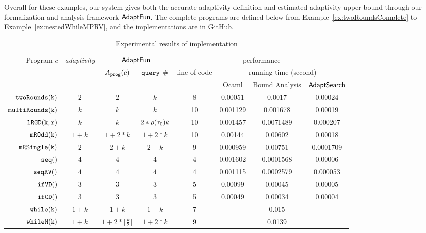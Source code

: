 Overall for these examples, our system gives both the accurate adaptivity definition and estimated
adaptivity upper bound through our formalization and analysis framework $\textsf{AdaptFun}$.
The complete programs are defined below from Example~\ref{ex:twoRoundsComplete} to Example~\ref{ex:nestedWhileMPRV},
and the implementations are in GitHub.
{\tiny
\begin {table}[H]
    \caption{Experimental results of {\THESYSTEM} implementation}
        \label{tb:adapt-imp}
        \begin{center}
        \centering
{\footnotesize
        \begin{tabular}{ r | c | c | c | c | c | c | c  }
        \multirow{3}{*}{Program $c$} & 
        \multirow{3}{*}{\emph{adaptivity}}
         & \multicolumn{2}{c|}{$\textsf{AdaptFun}$}
         & \multicolumn{4}{c}{performance} \\ 
         \cline{3-8}
         & & \multirow{2}{*}{$A_{\mathtt{prog}}(c)$} & \multirow{2}{*}{${\tt query}$ \#} & \multirow{2}{*}{line of code} & \multicolumn{3}{c}{running time (second)} \\ 
         \cline{6-8}
         & & & &  & Ocaml & Bound Analysis & $\mathsf{AdaptSearch}$  \\
         \hline \hline
         $  \mathtt{twoRounds(k)}$ & $2$ &  $2$ & $k$ & 8 & 0.00051 & 0.0017 & 0.00024 \\
         $  \mathtt{multiRounds(k)}$ & $k$ &  $k$ & $k$  &  10 & 0.001129 & 0.001678 & 0.00019 \\
         $  \mathtt{lRGD(k, r)}$ & $k$ & $k$ & $2 * \rho(\mathtt{\tau}_0) k$  &  10 & 0.001457 & 0.0071489 & 0.000207  \\
         $  \mathtt{mROdd(k)}$ & $1 + k$ &  $1 +2 * k$ & $1 + 2*k$  &  10 & 0.00144 & 0.00602 & 0.00018 \\
         $  \mathtt{mRSingle(k)}$    & $2$ &  $2 + k$ & $2 + k$  &  9 & 0.000959 & 0.00751 & 0.0001709 \\
         $  \mathtt{seq()}$ & $4$ & $4$ & $4$ & 4 & 0.001602 & 0.0001568 & 0.00006 \\ 
         $  \mathtt{seqRV()}$ & $4$ & $4$ &  $4$ & 4 & 0.001115 & 0.0002579 & 0.000053\\  
         $  \mathtt{ifVD()}$ & $3$ & $3$ &  $3$ & 5 & 0.00099 & 0.00045  & 0.00005 \\
         $  \mathtt{ifCD()}$ & $3$ & $3$ &   $3$  & 5 & 0.00049 & 0.00034  & 0.00004 \\
         $  \mathtt{while(k)}$ & $1+k$ &   $1+k$  &  $1+k$ & 7 & & 0.015 \\
         $  \mathtt{whileM(k)}$ & $1 + k$ &  $1 +2 * \lfloor \frac{k}{2} \rfloor$ & $1 + 2 * k$  &  9 & & 0.0139  \\

\end{tabular}}
\end{center}
\end{table}}
